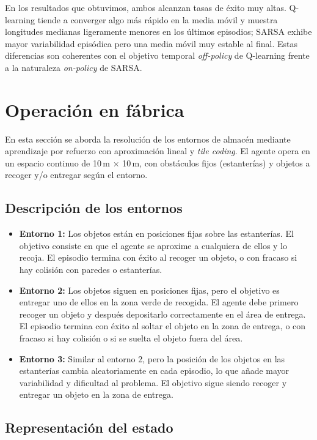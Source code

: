 \documentclass[a4paper,12pt]{article}
\begin{document}
En los resultados que obtuvimos, ambos alcanzan tasas de éxito muy altas. Q-learning tiende a converger algo más rápido en la media móvil y muestra longitudes medianas ligeramente menores en los últimos episodios; SARSA exhibe mayor variabilidad episódica pero una media móvil muy estable al final. Estas diferencias son coherentes con el objetivo temporal \emph{off-policy} de Q-learning frente a la naturaleza \emph{on-policy} de SARSA.

\newpage

\section{Operación en fábrica}

En esta sección se aborda la resolución de los entornos de almacén mediante aprendizaje por refuerzo con aproximación lineal y \textit{tile coding}. El agente opera en un espacio continuo de 10\,m $\times$ 10\,m, con obstáculos fijos (estanterías) y objetos a recoger y/o entregar según el entorno.

\subsection{Descripción de los entornos}

\begin{itemize}
    \item \textbf{Entorno 1:} Los objetos están en posiciones fijas sobre las estanterías. El objetivo consiste en que el agente se aproxime a cualquiera de ellos y lo recoja. El episodio termina con éxito al recoger un objeto, o con fracaso si hay colisión con paredes o estanterías.
    \item \textbf{Entorno 2:} Los objetos siguen en posiciones fijas, pero el objetivo es entregar uno de ellos en la zona verde de recogida. El agente debe primero recoger un objeto y después depositarlo correctamente en el área de entrega. El episodio termina con éxito al soltar el objeto en la zona de entrega, o con fracaso si hay colisión o si se suelta el objeto fuera del área.
    \item \textbf{Entorno 3:} Similar al entorno 2, pero la posición de los objetos en las estanterías cambia aleatoriamente en cada episodio, lo que añade mayor variabilidad y dificultad al problema. El objetivo sigue siendo recoger y entregar un objeto en la zona de entrega.
\end{itemize}

\subsection{Representación del estado}
\end{document}
